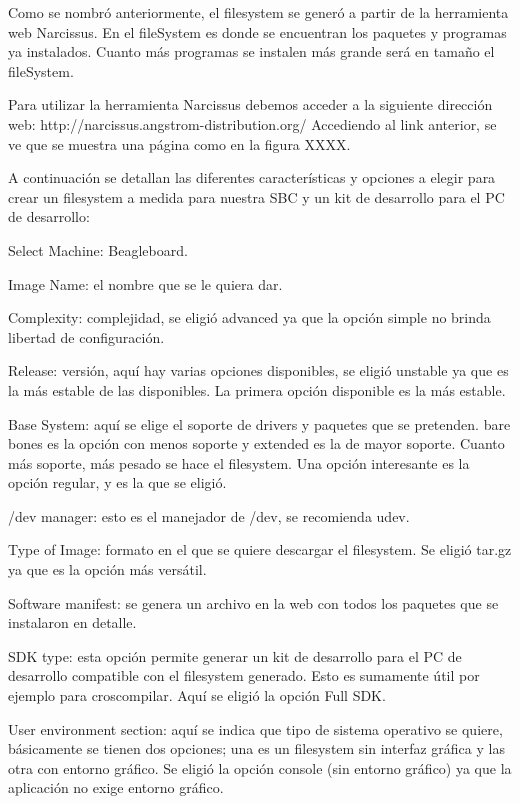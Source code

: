 Como se nombró anteriormente, el filesystem se generó a partir de la herramienta web Narcissus.
En el fileSystem es donde se encuentran los paquetes y programas ya instalados. Cuanto más programas se instalen más grande será en tamaño el fileSystem.

\bigskip
Para utilizar la herramienta Narcissus debemos acceder a la siguiente dirección web: http://narcissus.angstrom-distribution.org/ 
Accediendo al link anterior, se ve que se muestra una página como en la figura XXXX.

\bigskip
A continuación se detallan las diferentes características y opciones a elegir para crear un filesystem a medida para nuestra SBC y un kit de desarrollo para el PC de desarrollo:

\bigskip
Select Machine: Beagleboard.

Image Name: el nombre que se le quiera dar.

Complexity: complejidad, se eligió advanced ya que la opción simple no brinda libertad de configuración.

Release: versión, aquí hay varias opciones disponibles, se eligió unstable ya que es la más estable de las disponibles. La primera opción disponible es la más estable.

Base System: aquí se elige el soporte de drivers y paquetes que se pretenden. bare bones es la opción con menos soporte y extended es la de mayor soporte. Cuanto más soporte, más pesado se hace el filesystem. Una opción interesante es la opción regular, y es la que se eligió.

/dev manager: esto es el manejador de /dev, se recomienda udev.

Type of Image: formato en el que se quiere descargar el filesystem. Se eligió tar.gz ya que es la opción más versátil.

Software manifest: se genera un archivo en la web con todos los paquetes que se instalaron en detalle.

SDK type: esta opción permite generar un kit de desarrollo para el PC de desarrollo compatible con el filesystem generado. Esto es sumamente útil por ejemplo para croscompilar. Aquí se eligió la opción Full SDK.

User environment section: aquí se indica que tipo de sistema operativo se quiere, básicamente se tienen dos opciones; una es un filesystem sin interfaz gráfica y las otra con entorno gráfico. Se eligió la opción console (sin entorno gráfico) ya que la aplicación no exige entorno gráfico.

